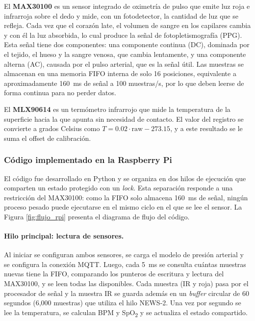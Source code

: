 \documentclass[11pt,a4paper]{article}
\begin{document}
El \textbf{MAX30100} es un sensor integrado de oximetría de pulso que emite luz roja e infrarroja sobre el dedo y mide, con un fotodetector, la cantidad de luz que se refleja. Cada vez que el corazón late, el volumen de sangre en los capilares cambia y con él la luz absorbida, lo cual produce la señal de fotopletismografía (PPG). Esta señal tiene dos componentes: una componente continua (DC), dominada por el tejido, el hueso y la sangre venosa, que cambia lentamente, y una componente alterna (AC), causada por el pulso arterial, que es la señal útil. Las muestras se almacenan en una memoria FIFO interna de solo 16 posiciones, equivalente a aproximadamente 160~ms de señal a 100 muestras/s, por lo que deben leerse de forma continua para no perder datos.

El \textbf{MLX90614} es un termómetro infrarrojo que mide la temperatura de la superficie hacia la que apunta sin necesidad de contacto. El valor del registro se convierte a grados Celsius como $T = 0.02 \cdot \text{raw} - 273.15$, y a este resultado se le suma el offset de calibración.

\subsubsection{Código implementado en la Raspberry Pi}

El código fue desarrollado en Python y se organiza en dos hilos de ejecución que comparten un estado protegido con un \textit{lock}. Esta separación responde a una restricción del MAX30100: como la FIFO solo almacena 160~ms de señal, ningún proceso pesado puede ejecutarse en el mismo ciclo en el que se lee el sensor. La Figura \ref{fig:flujo_rpi} presenta el diagrama de flujo del código.

\paragraph{Hilo principal: lectura de sensores.} Al iniciar se configuran ambos sensores, se carga el modelo de presión arterial y se configura la conexión MQTT. Luego, cada 5~ms se consulta cuántas muestras nuevas tiene la FIFO, comparando los punteros de escritura y lectura del MAX30100, y se leen todas las disponibles. Cada muestra (IR y roja) pasa por el procesador de señal y la muestra IR se guarda además en un \textit{buffer} circular de 60 segundos (6,000 muestras) que utiliza el hilo NEWS-2. Una vez por segundo se lee la temperatura, se calculan BPM y SpO\textsubscript{2} y se actualiza el estado compartido.
\end{document}
